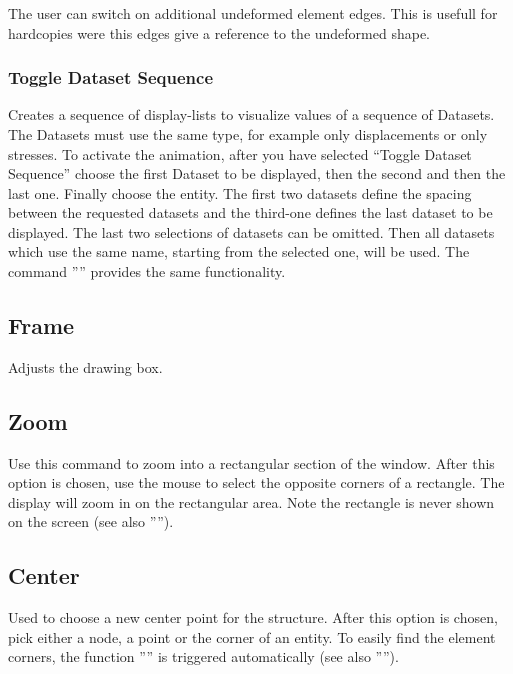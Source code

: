 \documentclass{article}
\begin{document}
\subsubsection{\label{Toggle Static Element Edges}}
The user can switch on additional undeformed element edges. This is usefull for hardcopies were this edges give a reference to the undeformed shape.

\subsubsection{\label{Toggle Dataset Sequence}Toggle Dataset Sequence}
Creates a sequence of display-lists to visualize values of a sequence of Datasets. The Datasets must use the same type, for example only displacements or only stresses. To activate the animation, after you have selected ``Toggle Dataset Sequence'' choose the first Dataset to be displayed, then the second  and then the last one. Finally choose the entity. The first two datasets define the spacing between the requested datasets and the third-one defines the last dataset to be displayed. The last two selections of datasets can be omitted. Then all datasets which use the same name, starting from the selected one, will be used. The command '''' provides the same functionality. 

\subsection{\label{Frame}Frame}
Adjusts the drawing box.

\subsection{\label{Zoom}Zoom}
Use this command to zoom into a rectangular section of the window. After this option is chosen, use the mouse to select the opposite corners of a rectangle.  The display will zoom in on the rectangular area.  Note the rectangle is never shown on the screen (see also '''').

\subsection{\label{Center}Center}
Used to choose a new center point for the structure. After this option is chosen, pick either a node, a point or the corner of an entity. To easily find the element corners, the function '''' is triggered automatically (see also '''').
\end{document}
